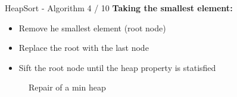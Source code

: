 
\begin{frame}{HeapSort - Algorithm 4 / 10}
  \textbf{Taking the smallest element:}
  \begin{itemize}
    \item
      Remove he smallest element (root node)
    \item
      Replace the root with the last node
    \item
      {\color{Mittel-Blau}Sift} the root node until the
      {\color{Mittel-Blau}heap property} is statisfied
  \end{itemize}
  \begin{figure}[!h]%
    \begin{columns}%
      \begin{column}{0.3\textwidth}%
        \begin{adjustbox}{width=\linewidth}
        \end{adjustbox}%
      \end{column}%
      \hspace*{0.05em}%
      \begin{column}{0.3\textwidth}%
        \begin{adjustbox}{width=\linewidth}
        \end{adjustbox}
      \end{column}%
      \hspace*{0.05em}%
      \begin{column}{0.3\textwidth}%
        \begin{adjustbox}{width=\linewidth}
        \end{adjustbox}%
      \end{column}%
    \end{columns}%
    \caption{Repair of a min heap}%
    \label{fig:minheap_repair}%
  \end{figure}
\end{frame}


